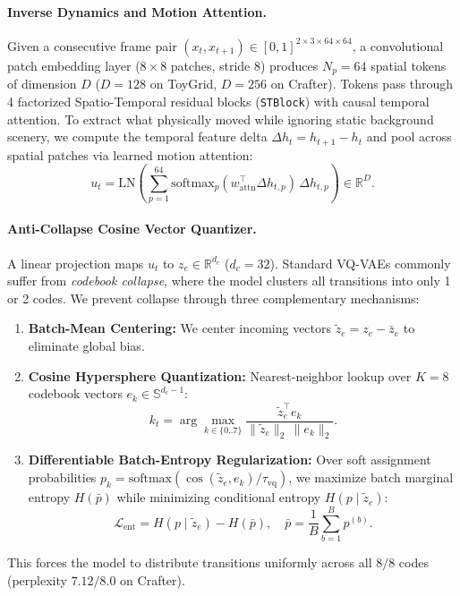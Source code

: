 \documentclass[11pt,letterpaper]{article}
\begin{document}
\paragraph{Inverse Dynamics and Motion Attention.}
Given a consecutive frame pair $(x_t, x_{t+1}) \in [0, 1]^{2 \times 3 \times 64 \times 64}$, a convolutional patch embedding layer ($8 \times 8$ patches, stride $8$) produces $N_p = 64$ spatial tokens of dimension $D$ ($D=128$ on ToyGrid, $D=256$ on Crafter). Tokens pass through 4 factorized Spatio-Temporal residual blocks (\texttt{STBlock}) with causal temporal attention. To extract what physically moved while ignoring static background scenery, we compute the temporal feature delta $\Delta h_t = h_{t+1} - h_t$ and pool across spatial patches via learned motion attention:
\begin{equation}
  u_t = \text{LN}\!\left(\sum_{p=1}^{64} \text{softmax}_p(w_{\text{attn}}^\top \Delta h_{t,p}) \, \Delta h_{t,p}\right) \in \mathbb{R}^D.
\end{equation}

\paragraph{Anti-Collapse Cosine Vector Quantizer.}
A linear projection maps $u_t$ to $z_e \in \mathbb{R}^{d_c}$ ($d_c = 32$). Standard VQ-VAEs \cite{vandoord2017vqvae} commonly suffer from \emph{codebook collapse}, where the model clusters all transitions into only 1 or 2 codes. We prevent collapse through three complementary mechanisms:
\begin{enumerate}
  \item \textbf{Batch-Mean Centering:} We center incoming vectors $\tilde{z}_e = z_e - \bar{z}_e$ to eliminate global bias.
  \item \textbf{Cosine Hypersphere Quantization:} Nearest-neighbor lookup over $K=8$ codebook vectors $e_k \in \mathbb{S}^{d_c-1}$:
  \begin{equation}
    k_t = \arg\max_{k \in \{0..7\}} \frac{\tilde{z}_e^\top e_k}{\|\tilde{z}_e\|_2 \, \|e_k\|_2}.
  \end{equation}
  \item \textbf{Differentiable Batch-Entropy Regularization:} Over soft assignment probabilities $p_k = \text{softmax}(\cos(\tilde{z}_e, e_k)/\tau_{\text{vq}})$, we maximize batch marginal entropy $H(\bar{p})$ while minimizing conditional entropy $H(p \mid \tilde{z}_e)$:
  \begin{equation}
    \mathcal{L}_{\text{ent}} = H(p \mid \tilde{z}_e) - H(\bar{p}), \quad \bar{p} = \frac{1}{B}\sum_{b=1}^B p^{(b)}.
  \end{equation}
\end{enumerate}
This forces the model to distribute transitions uniformly across all $8/8$ codes (perplexity $7.12 / 8.0$ on Crafter).
\end{document}
